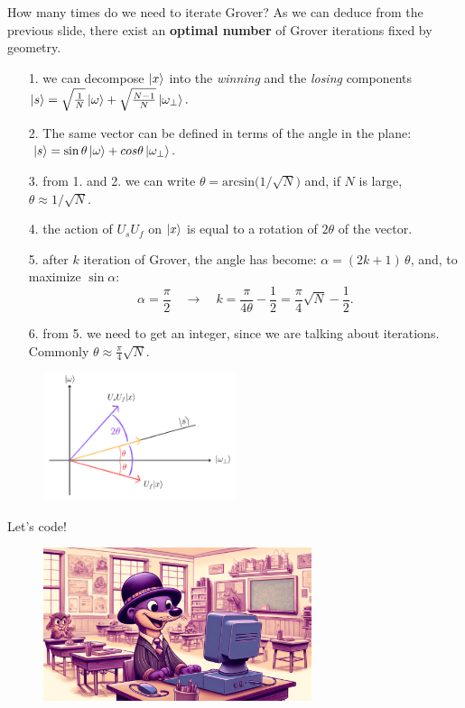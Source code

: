 \documentclass[aspectratio=169, 8pt, xcolor={svgnames}, hyperref={linkcolor=black}]{beamer}
\begin{document}
\begin{frame}{How many times do we need to iterate Grover?}
As we can deduce from the previous slide, there exist an \textbf{optimal number} of Grover iterations fixed by geometry.

\begin{itemize}
\item[1.] we can decompose $\ket{x}$ into the \textit{winning} and the \textit{losing} 
components $\ket{s} = \sqrt{\frac{1}{N}} \ket{\omega} + \sqrt{\frac{N-1}{N}} \ket{\omega_{\bot}}.$
\item[2.]  The same vector can be
defined in terms of the angle in the plane: $\,\ket{s} = \sin \theta \ket{\omega} + cos \theta \ket{\omega_{\bot}}.$
\end{itemize}
\begin{multicols}{2}
\begin{itemize}
\item[3.] from 1. and 2. we can write $\theta = \text{arcsin}\bigl(1/\sqrt{N}\bigr)$ and, if $N$ is large,
$\theta \approx 1/\sqrt{N}. $
\item[4.] the action of $U_s U_f$ on $\ket{x}$ is equal to a rotation of $2\theta$ of the vector.
\item[5.] after $k$ iteration of Grover, the angle has become: $\alpha = (2k + 1)\,\theta$, and, to maximize $\sin \alpha$:
$$ \alpha = \frac{\pi}{2} \quad \to \quad k = \frac{\pi}{4\theta} - \frac{1}{2} = \frac{\pi}{4} \sqrt{N} - \frac{1}{2}. $$
\item[6.] from 5. we need to get an integer, since we are talking about iterations. 
Commonly $\theta \approx \frac{\pi}{4} \sqrt{N}.$ 
\end{itemize}
\begin{figure}
   \includegraphics[width=0.5\textwidth]{figures/thetas.png}
\end{figure}
\end{multicols}
\end{frame}

\begin{frame}
\centering
\Huge Let's code!
\begin{figure}
   \includegraphics[width=0.7\textwidth]{figures/hands_on.png}
\end{figure}
\end{frame}
\end{document}
